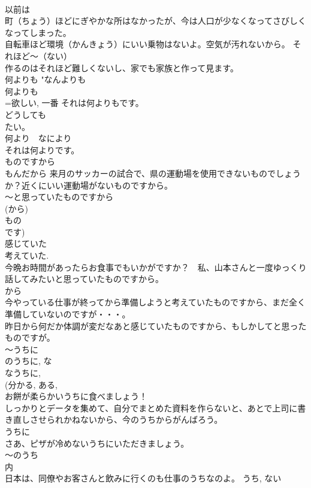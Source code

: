 \documentclass[8pt]{extreport}
\begin{document}
\begin{CJK}{UTF8}{min}
\\	以前は
\\	町（ちょう）ほどにぎやかな所はなかったが、今は人口が少なくなってさびしくなってしまった。 
\\	自転車ほど環境（かんきょう）にいい乗物はないよ。空気が汚れないから。 それほど～（ない） 
\\	作るのはそれほど難しくないし、家でも家族と作って見ます。 
\\	何よりも	"なんよりも 
\\	何よりも
\\	=欲しい, 一番 それは何よりもです。　
\\	どうしても
\\	たい。　
\\	何より　なにより 
\\	それは何よりです。 
\\	ものですから	
\\	もんだから 来月のサッカーの試合で、県の運動場を使用できないものでしょうか？近くにいい運動場がないものですから。 
\\	～と思っていたものですから 
\\	(から) 
\\	もの
\\	です) 
\\	感じていた 
\\	考えていた. 
\\	今晩お時間があったらお食事でもいかがですか？　私、山本さんと一度ゆっくり話してみたいと思っていたものですから。 
\\	から 
\\	今やっている仕事が終ってから準備しようと考えていたものですから、まだ全く準備していないのですが・・・。 
\\	昨日から何だか体調が変だなあと感じていたものですから、もしかしてと思ったものですが。 
\\	～うちに	
\\	のうちに, な
\\	なうちに, 
\\	(分かる, ある, 
\\	お餅が柔らかいうちに食べましょう！ 
\\	しっかりとデータを集めて、自分でまとめた資料を作らないと、あとで上司に書き直しさせられかねないから、今のうちからがんばろう。 
\\	うちに 
\\	さあ、ピザが冷めないうちにいただきましょう。 
\\	～のうち 
\\	内 
\\	日本は、同僚やお客さんと飲みに行くのも仕事のうちなのよ。 うち, ない 

\end{CJK}
\end{document}
